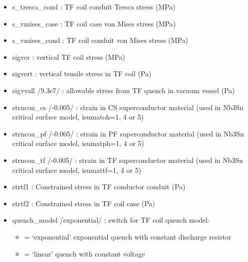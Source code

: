 \documentclass[]{article}
\providecommand{\tightlist}{%
  \setlength{\itemsep}{0pt}\setlength{\parskip}{0pt}}
\begin{document}
\begin{itemize}
\item
  s\_tresca\_cond : TF coil conduit Tresca stress (MPa)
\item
  s\_vmises\_case : TF coil case von Mises stress (MPa)
\item
  s\_vmises\_cond : TF coil conduit von Mises stress (MPa)
\item
  sigver : vertical TF coil stress (MPa)
\item
  sigvert : vertical tensile stress in TF coil (Pa)
\item
  sigvvall /9.3e7/ : allowable stress from TF quench in vacuum vessel
  (Pa)
\item
  strncon\_cs /-0.005/ : strain in CS superconductor material (used in
  Nb3Sn critical surface model, isumatoh=1, 4 or 5)
\item
  strncon\_pf /-0.005/ : strain in PF superconductor material (used in
  Nb3Sn critical surface model, isumatph=1, 4 or 5)
\item
  strncon\_tf /-0.005/ : strain in TF superconductor material (used in
  Nb3Sn critical surface model, isumattf=1, 4 or 5)
\item
  strtf1 : Constrained stress in TF conductor conduit (Pa)
\item
  strtf2 : Constrained stress in TF coil case (Pa)
\item
  quench\_model /exponential/ : switch for TF coil quench model:

  \begin{itemize}
  \tightlist
  \item
    = `exponential' exponential quench with constant discharge resistor
  \item
    = `linear' quench with constant voltage
  \end{itemize}


\end{itemize}
\end{document}
